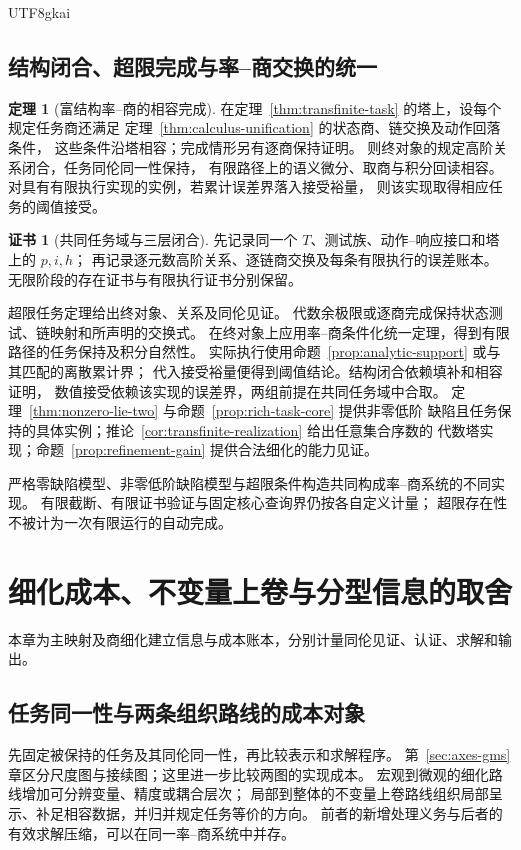 \documentclass[12pt]{report}
\makeatletter
\theoremstyle{definition}
\newtheorem{theorem}{定理}[chapter]
\newtheorem{Certificate}{证书}[chapter]
\renewenvironment{proof}[1][\proofname]{\par
  \pushQED{\qed}\normalfont
  \topsep6\p@\@plus6\p@\relax
  \trivlist
  \item[\hskip\labelsep\normalfont #1\@addpunct{.}]\ignorespaces
}{
  \popQED\endtrivlist\@endpefalse
}
\makeatother
\begin{document}
\begin{CJK*}{UTF8}{gkai}
\section{结构闭合、超限完成与率--商交换的统一}
\begin{theorem}[富结构率--商的相容完成]
\label{thm:rich-calculus}
在定理~\ref{thm:transfinite-task} 的塔上，设每个规定任务商还满足
定理~\ref{thm:calculus-unification} 的状态商、链交换及动作回落条件，
这些条件沿塔相容；完成情形另有逐商保持证明。
则终对象的规定高阶关系闭合，任务同伦同一性保持，
有限路径上的语义微分、取商与积分回读相容。
对具有有限执行实现的实例，若累计误差界落入接受裕量，
则该实现取得相应任务的阈值接受。
\end{theorem}
\begin{Certificate}[共同任务域与三层闭合]
先记录同一个 \(T\)、测试族、动作--响应接口和塔上的 \(p,i,h\)；
再记录逐元数高阶关系、逐链商交换及每条有限执行的误差账本。
无限阶段的存在证书与有限执行证书分别保留。
\end{Certificate}
\begin{proof}
超限任务定理给出终对象、关系及同伦见证。
代数余极限或逐商完成保持状态测试、链映射和所声明的交换式。
在终对象上应用率--商条件化统一定理，得到有限路径的任务保持及积分自然性。
实际执行使用命题~\ref{prop:analytic-support} 或与其匹配的离散累计界；
代入接受裕量便得到阈值结论。结构闭合依赖填补和相容证明，
数值接受依赖该实现的误差界，两组前提在共同任务域中合取。
定理~\ref{thm:nonzero-lie-two} 与命题~\ref{prop:rich-task-core} 提供非零低阶
缺陷且任务保持的具体实例；推论~\ref{cor:transfinite-realization} 给出任意集合序数的
代数塔实现；命题~\ref{prop:refinement-gain} 提供合法细化的能力见证。
\end{proof}
严格零缺陷模型、非零低阶缺陷模型与超限条件构造共同构成率--商系统的不同实现。
有限截断、有限证书验证与固定核心查询界仍按各自定义计量；
超限存在性不被计为一次有限运行的自动完成。

\chapter{细化成本、不变量上卷与分型信息的取舍}
\label{sec:resolution-cost-typing}
本章为主映射及商细化建立信息与成本账本，分别计量同伦见证、认证、求解和输出。

\section{任务同一性与两条组织路线的成本对象}
先固定被保持的任务及其同伦同一性，再比较表示和求解程序。
第~\ref{sec:axes-gms} 章区分尺度图与接续图；这里进一步比较两图的实现成本。
宏观到微观的细化路线增加可分辨变量、精度或耦合层次；
局部到整体的不变量上卷路线组织局部呈示、补足相容数据，并归并规定任务等价的方向。
前者的新增处理义务与后者的有效求解压缩，可以在同一率--商系统中并存。


\end{CJK*}
\end{document}
